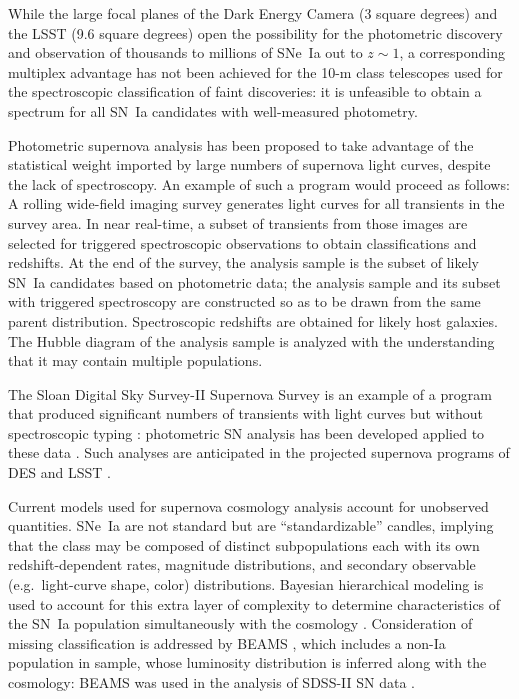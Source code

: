 \documentclass[preprint,3p]{elsarticle}
\begin{document}
While the large focal planes of the Dark Energy Camera (3 square degrees)
and the LSST (9.6 square degrees) open the
possibility for the photometric discovery and observation of thousands to millions
of SNe~Ia out to $z\sim1$, a corresponding multiplex advantage has not been
achieved for the 10-m
class telescopes used for the spectroscopic classification of faint discoveries:
it is unfeasible to obtain a spectrum for all SN~Ia candidates with well-measured
photometry.

Photometric supernova analysis has been proposed to  take advantage of the statistical weight imported by large numbers of supernova light curves, despite the lack of spectroscopy.
An example of such a program would proceed as follows: A rolling wide-field imaging
survey generates light curves for all transients in the survey area.  In near real-time,
a subset 
of transients from those images are selected for triggered spectroscopic observations
to obtain classifications and redshifts.  At the end of the survey, the
analysis sample is the subset of likely SN~Ia
candidates based on photometric data;  the analysis sample and its subset
with triggered spectroscopy are constructed so as to be drawn from the same parent distribution.
Spectroscopic redshifts are obtained for likely host galaxies.  The Hubble diagram of the
analysis sample is analyzed with the understanding that it may contain multiple populations.

The Sloan Digital Sky Survey-II Supernova Survey is an example of a program
that produced significant numbers of transients
with light curves but without spectroscopic typing \citep{2014arXiv1401.3317S}:
photometric SN analysis has been developed applied to these data \citep{2012ApJ...752...79H,
2013ApJ...763...88C}.   Such analyses are anticipated in the projected
supernova programs of 
DES \citep{2012ApJ...753..152B} and LSST \citep{2012arXiv1211.0310L}.

Current models used for supernova cosmology analysis account for unobserved quantities.
SNe~Ia are not standard but are ``standardizable'' candles, implying that the class may be composed of distinct subpopulations each with its own redshift-dependent rates, magnitude distributions, and secondary
observable (e.g.\ light-curve shape, color) distributions.  Bayesian hierarchical modeling is 
used to account for this extra layer of complexity  to determine characteristics of the SN~Ia population simultaneously
with the cosmology \citep{2011MNRAS.418.2308M,
2015arXiv150701602R}.  Consideration of missing classification is addressed
by
BEAMS \citep{2007PhRvD..75j3508K}, which  includes a non-Ia population in sample, whose luminosity distribution
is inferred along with the cosmology:
BEAMS was used in the analysis of SDSS-II SN data \citep{2012ApJ...752...79H}.
\end{document}
